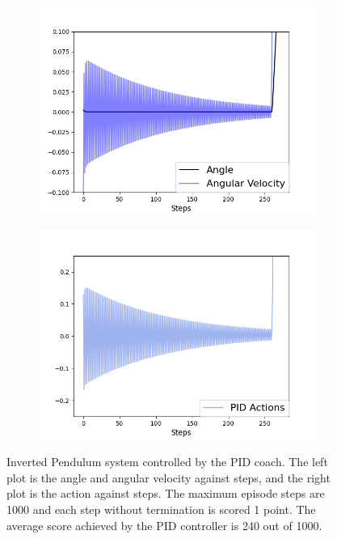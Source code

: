 \documentclass[journal]{IEEEtran}
\begin{document}
\begin{figure}[H]
\centering
\begin{subfigure}{0.25\textwidth}
  \centering
  \includegraphics[width=\linewidth]{ip_PID.png}
  \label{fig:ip_pid}
\end{subfigure}%
\begin{subfigure}{.25\textwidth}
  \centering
  \includegraphics[width=\linewidth]{ip_PID_actions.png}
  \label{fig:ip_pid_actions}
\end{subfigure}
\caption{Inverted Pendulum system controlled by the PID coach. The left plot is the angle and angular velocity against steps, and the right plot is the action against steps. The maximum episode steps are 1000 and each step without termination is scored 1 point. The average score achieved by the PID controller is 240 out of 1000.}
\label{fig:ip}
\end{figure}
\end{document}

